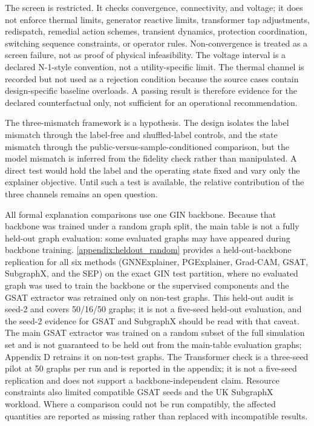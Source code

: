 The screen is restricted. It checks convergence, connectivity, and voltage; it does not enforce thermal limits, generator reactive limits, transformer tap adjustments, redispatch, remedial action schemes, transient dynamics, protection coordination, switching sequence constraints, or operator rules. Non-convergence is treated as a screen failure, not as proof of physical infeasibility. The voltage interval is a declared N-1-style convention, not a utility-specific limit. The thermal channel is recorded but not used as a rejection condition because the source cases contain design-specific baseline overloads. A passing result is therefore evidence for the declared counterfactual only, not sufficient for an operational recommendation.

The three-mismatch framework is a hypothesis. The design isolates the label mismatch through the label-free and shuffled-label controls, and the state mismatch through the public-versus-sample-conditioned comparison, but the model mismatch is inferred from the fidelity check rather than manipulated. A direct test would hold the label and the operating state fixed and vary only the explainer objective. Until such a test is available, the relative contribution of the three channels remains an open question.

All formal explanation comparisons use one GIN backbone. Because that backbone was trained under a random graph split, the main table is not a fully held-out graph evaluation: some evaluated graphs may have appeared during backbone training. \ref{appendix:heldout_random} provides a held-out-backbone replication for all six methods (GNNExplainer, PGExplainer, Grad-CAM, GSAT, SubgraphX, and the SEP) on the exact GIN test partition, where no evaluated graph was used to train the backbone or the supervised components and the GSAT extractor was retrained only on non-test graphs. This held-out audit is seed-2 and covers 50/16/50 graphs; it is not a five-seed held-out evaluation, and the seed-2 evidence for GSAT and SubgraphX should be read with that caveat. The main GSAT extractor was trained on a random subset of the full simulation set and is not guaranteed to be held out from the main-table evaluation graphs; Appendix D retrains it on non-test graphs. The Transformer check is a three-seed pilot at 50 graphs per run and is reported in the appendix; it is not a five-seed replication and does not support a backbone-independent claim. Resource constraints also limited compatible GSAT seeds and the UK SubgraphX workload. Where a comparison could not be run compatibly, the affected quantities are reported as missing rather than replaced with incompatible results.

